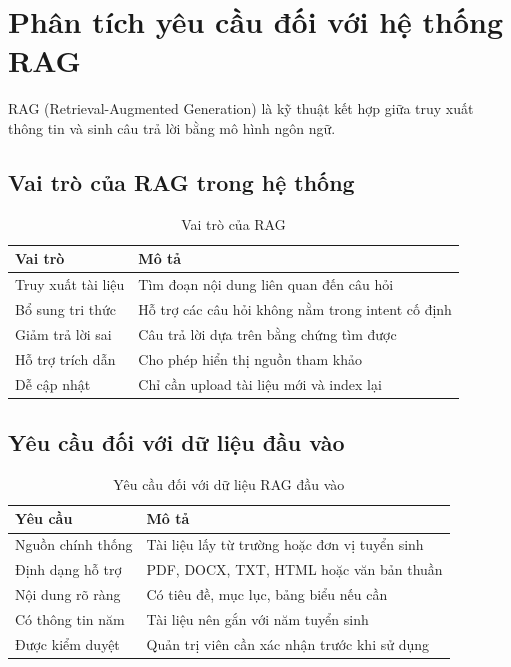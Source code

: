 \section{Phân tích yêu cầu đối với hệ thống RAG}

RAG (Retrieval-Augmented Generation) là kỹ thuật kết hợp giữa truy xuất thông tin và sinh câu trả lời bằng mô hình ngôn ngữ.

\subsection{Vai trò của RAG trong hệ thống}
\begin{table}[H]
\centering
\caption{Vai trò của RAG}
\label{tab:rag_roles}
\begin{tabular}{|p{4cm}|p{8cm}|}
\hline
\textbf{Vai trò} & \textbf{Mô tả} \\ \hline
Truy xuất tài liệu & Tìm đoạn nội dung liên quan đến câu hỏi \\ \hline
Bổ sung tri thức & Hỗ trợ các câu hỏi không nằm trong intent cố định \\ \hline
Giảm trả lời sai & Câu trả lời dựa trên bằng chứng tìm được \\ \hline
Hỗ trợ trích dẫn & Cho phép hiển thị nguồn tham khảo \\ \hline
Dễ cập nhật & Chỉ cần upload tài liệu mới và index lại \\ \hline
\end{tabular}
\end{table}

\subsection{Yêu cầu đối với dữ liệu đầu vào}
\begin{table}[H]
\centering
\caption{Yêu cầu đối với dữ liệu RAG đầu vào}
\label{tab:rag_input_requirements}
\begin{tabular}{|p{4cm}|p{8cm}|}
\hline
\textbf{Yêu cầu} & \textbf{Mô tả} \\ \hline
Nguồn chính thống & Tài liệu lấy từ trường hoặc đơn vị tuyển sinh \\ \hline
Định dạng hỗ trợ & PDF, DOCX, TXT, HTML hoặc văn bản thuần \\ \hline
Nội dung rõ ràng & Có tiêu đề, mục lục, bảng biểu nếu cần \\ \hline
Có thông tin năm & Tài liệu nên gắn với năm tuyển sinh \\ \hline
Được kiểm duyệt & Quản trị viên cần xác nhận trước khi sử dụng \\ \hline
\end{tabular}
\end{table}

